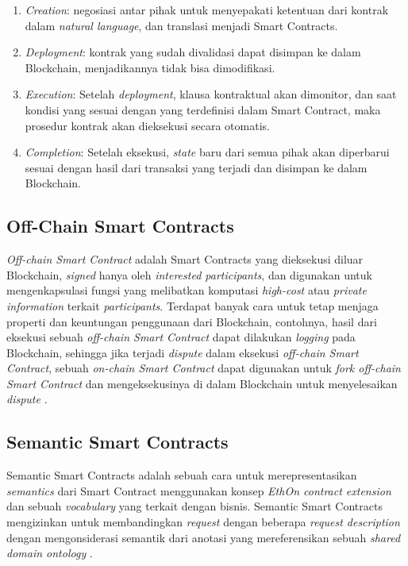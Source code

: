 \begin{enumerate}
	\item \textit{Creation}: negosiasi antar pihak untuk menyepakati ketentuan dari kontrak dalam \textit{natural language}, dan translasi menjadi Smart Contracts.
	\item \textit{Deployment}: kontrak yang sudah divalidasi dapat disimpan ke dalam Blockchain, menjadikannya tidak bisa dimodifikasi.
	\item \textit{Execution}: Setelah \textit{deployment}, klausa kontraktual akan dimonitor, dan saat kondisi yang sesuai dengan yang terdefinisi dalam Smart Contract, maka prosedur kontrak akan dieksekusi secara otomatis.
	\item \textit{Completion}: Setelah eksekusi, \textit{state} baru dari semua pihak akan diperbarui sesuai dengan hasil dari transaksi yang terjadi dan disimpan ke dalam Blockchain. 
\end{enumerate}

\subsection{Off-Chain Smart Contracts}
\label{subsec:off-chain-smart-contracts}

\textit{Off-chain Smart Contract} adalah Smart Contracts yang dieksekusi diluar Blockchain, \textit{signed} hanya oleh \textit{interested participants}, dan digunakan untuk mengenkapsulasi fungsi yang melibatkan komputasi \textit{high-cost} atau \textit{private information} terkait \textit{participants}. Terdapat banyak cara untuk tetap menjaga properti dan keuntungan penggunaan dari Blockchain, contohnya, hasil dari eksekusi sebuah \textit{off-chain Smart Contract} dapat dilakukan \textit{logging} pada Blockchain, sehingga jika terjadi \textit{dispute} dalam eksekusi \textit{off-chain Smart Contract}, sebuah \textit{on-chain Smart Contract} dapat digunakan untuk \textit{fork off-chain Smart Contract} dan mengeksekusinya di dalam Blockchain untuk menyelesaikan \textit{dispute} \parencite{zou2019smart}.

\subsection{Semantic Smart Contracts}
\label{subsec:semantic-smart-contracts}
Semantic Smart Contracts adalah sebuah cara untuk merepresentasikan \textit{semantics} dari Smart Contract menggunakan konsep \textit{EthOn contract extension} dan sebuah \textit{vocabulary} yang terkait dengan bisnis. Semantic Smart Contracts mengizinkan untuk membandingkan \textit{request} dengan beberapa \textit{request description} dengan mengonsiderasi semantik dari anotasi yang mereferensikan sebuah \textit{shared domain ontology} \parencite{baqa2019semantic}.
